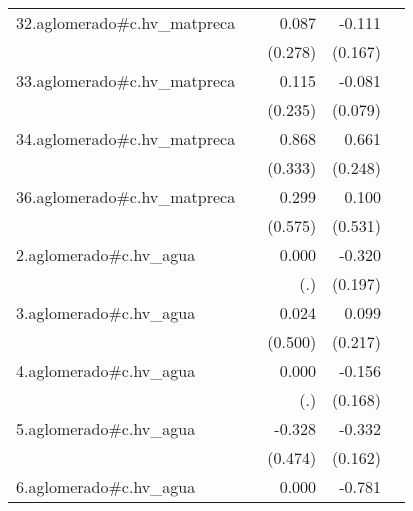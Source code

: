 {\begin{longtable}{l*{4}{D{.}{.}{-1}}}
\addlinespace
32.aglomerado#c.hv\_matpreca&                     &       0.087         &      -0.111         &                     \\
            &                     &     (0.278)         &     (0.167)         &                     \\
\addlinespace
33.aglomerado#c.hv\_matpreca&                     &       0.115         &      -0.081         &                     \\
            &                     &     (0.235)         &     (0.079)         &                     \\
\addlinespace
34.aglomerado#c.hv\_matpreca&                     &       0.868\sym{**} &       0.661\sym{**} &                     \\
            &                     &     (0.333)         &     (0.248)         &                     \\
\addlinespace
36.aglomerado#c.hv\_matpreca&                     &       0.299         &       0.100         &                     \\
            &                     &     (0.575)         &     (0.531)         &                     \\
\addlinespace
2.aglomerado#c.hv\_agua&                     &       0.000         &      -0.320         &                     \\
            &                     &         (.)         &     (0.197)         &                     \\
\addlinespace
3.aglomerado#c.hv\_agua&                     &       0.024         &       0.099         &                     \\
            &                     &     (0.500)         &     (0.217)         &                     \\
\addlinespace
4.aglomerado#c.hv\_agua&                     &       0.000         &      -0.156         &                     \\
            &                     &         (.)         &     (0.168)         &                     \\
\addlinespace
5.aglomerado#c.hv\_agua&                     &      -0.328         &      -0.332\sym{*}  &                     \\
            &                     &     (0.474)         &     (0.162)         &                     \\
\addlinespace
6.aglomerado#c.hv\_agua&                     &       0.000         &      -0.781\sym{***}&                     \\

\end{longtable}}

